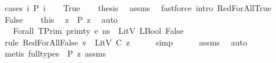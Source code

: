 \begin{isabellebody}
%
\isadelimproof
%
\endisadelimproof
%
\isatagproof
{}\isamarkupfalse%
\ {\isacharparenleft}{\kern0pt}cases\ {\isachardoublequoteopen}{\isacharparenleft}{\kern0pt}{\isasymforall}i{\isachardot}{\kern0pt}\ P\ i{\isacharparenright}{\kern0pt}{\isachardoublequoteclose}{\isacharparenright}{\kern0pt}\isanewline
\ \ \isamarkupfalse%
\ True\isanewline
\ \ \isamarkupfalse%
\ {\isacharquery}{\kern0pt}thesis\ \isamarkupfalse%
\ assms\ \isamarkupfalse%
\ {\isacharparenleft}{\kern0pt}fastforce\ intro{\isacharcolon}{\kern0pt}\ RedForAllTrue{\isacharparenright}{\kern0pt}\isanewline
{}\isamarkupfalse%
\isanewline
\ \ \isamarkupfalse%
\ False\isanewline
\ \ \isamarkupfalse%
\ this\ \isamarkupfalse%
\ z\ \ {\isachardoublequoteopen}{\isasymnot}{\isacharparenleft}{\kern0pt}P\ z{\isacharparenright}{\kern0pt}{\isachardoublequoteclose}\ \isamarkupfalse%
\ auto\isanewline
\ \ \isamarkupfalse%
\ {\isachardoublequoteopen}{\isasymLambda}{\isacharcomma}{\kern0pt}{\isasymGamma}{\isacharcomma}{\kern0pt}{\isasymOmega}\ {\isasymturnstile}\ {\isasymlangle}Forall\ {\isacharparenleft}{\kern0pt}TPrim\ primty{\isacharparenright}{\kern0pt}\ e{\isacharcomma}{\kern0pt}\ ns{\isasymrangle}\ {\isasymDown}\ LitV\ {\isacharparenleft}{\kern0pt}LBool\ False{\isacharparenright}{\kern0pt}{\isachardoublequoteclose}\isanewline
\ \ \ \ \isamarkupfalse%
\ {\isacharparenleft}{\kern0pt}rule\ RedForAllFalse{\isacharbrackleft}{\kern0pt}\ {\isacharquery}{\kern0pt}v\ {\isacharequal}{\kern0pt}\ {\isachardoublequoteopen}LitV\ {\isacharparenleft}{\kern0pt}C\ z{\isacharparenright}{\kern0pt}{\isachardoublequoteclose}{\isacharbrackright}{\kern0pt}{\isacharparenright}{\kern0pt}\isanewline
\ \ \ \ \isamarkupfalse%
\ simp\isanewline
\ \ \ \ \isamarkupfalse%
\ assms{\isacharparenleft}{\kern0pt}{}{\isacharparenright}{\kern0pt}\ \isamarkupfalse%
\ auto{\isacharbrackleft}{\kern0pt}{}{\isacharbrackright}{\kern0pt}\isanewline
\ \ \ \ \isamarkupfalse%
\ {\isacharparenleft}{\kern0pt}metis\ {\isacharparenleft}{\kern0pt}full{\isacharunderscore}{\kern0pt}types{\isacharparenright}{\kern0pt}\ {\isacartoucheopen}{\isasymnot}\ P\ z{\isacartoucheclose}\ assms{\isacharparenleft}{\kern0pt}{}{\isacharparenright}{\kern0pt}{\isacharparenright}{\kern0pt}\isanewline

\end{isabellebody}
